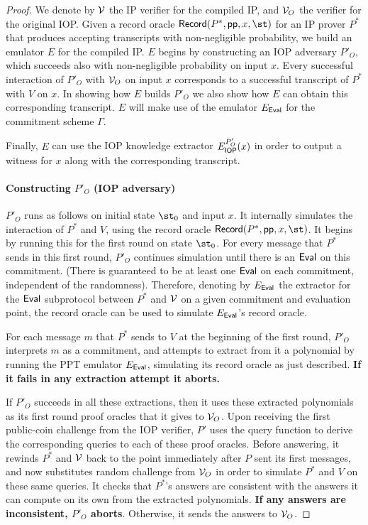 \begin{proof}
We denote by $\mathcal{V}$ the IP verifier for the compiled IP, and $\mathcal{V}_{O}$ the verifier for the original IOP. 
Given a record oracle $\pro{Record}(P^*, \params, x, \st)$ for an IP prover $P^*$ that produces accepting transcripts with non-negligible probability, we build an emulator $E$ for the compiled IP. $E$ begins by constructing an IOP adversary $P'_{O}$, which succeeds also with non-negligible probability on input $x$. Every successful interaction of $P'_{O}$ with $\mathcal{V}_{O}$ on input $x$ corresponds to a successful transcript of $P^*$ with $V$ on $x$. In showing how $E$ builds $P'_{O}$ we also show how $E$ can obtain this corresponding transcript. $E$ will make use of the emulator $E_{\textsf{{Eval}}}$ for the commitment scheme $\Gamma$. %

Finally, $E$ can use the IOP knowledge extractor $E_{\textsf{{IOP}}}^{P'_O}(x)$ in order to output a witness for $x$ along with the corresponding transcript. 

\paragraph{Constructing $P'_O$ (IOP adversary)}
$P'_O$ runs as follows on initial state $\st_0$ and input $x$. It internally simulates the interaction of $P^*$ and $V$, using the record oracle $\pro{Record}(P^*, \params, x, \st)$. It begins by running this for the first round on state $\st_0$. For every message that $P^*$ sends in this first round, $P'_O$ continues simulation until there is an $\textsf{{Eval}}$ on this commitment. (There is guaranteed to be at least one $\textsf{{Eval}}$ on each commitment, independent of the randomness). Therefore, denoting by $E_{\textsf{{Eval}}}$ the extractor for the $\textsf{{Eval}}$ subprotocol between $P^*$ and $\mathcal{V}$ on a given commitment and evaluation point, the record oracle can be used to simulate $E_{\textsf{{Eval}}}$'s record oracle.%

For each message $m$ that $P^*$ sends to $V$ at the beginning of the first round, $P'_O$ interprets $m$ as a commitment, and attempts to extract from it a polynomial by 
running the PPT emulator $E_{\textsf{{Eval}}}$, simulating its record oracle as just described. \textbf{If it fails in any extraction attempt it aborts.} 

If $P'_O$ succeeds in all these extractions, then it uses these extracted polynomials as its first round proof oracles that it gives to $\mathcal{V}_O$. Upon receiving the first public-coin challenge from the IOP verifier, $P'$ uses the query function to derive the corresponding queries to each of these proof oracles. Before answering, it rewinds $P^*$ and $\mathcal{V}$ back to the point immediately after $P$ sent its first messages, and now substitutes random challenge from $\mathcal{V}_O$ in order to simulate $P^*$ and $V$ on these same queries. It checks that $P^*$'s answers are consistent with the answers it can compute on its own from the extracted polynomials. \textbf{If any answers are inconsistent, $P'_O$ aborts}. Otherwise, it sends the answers to $\mathcal{V}_O$. 


\end{proof}
